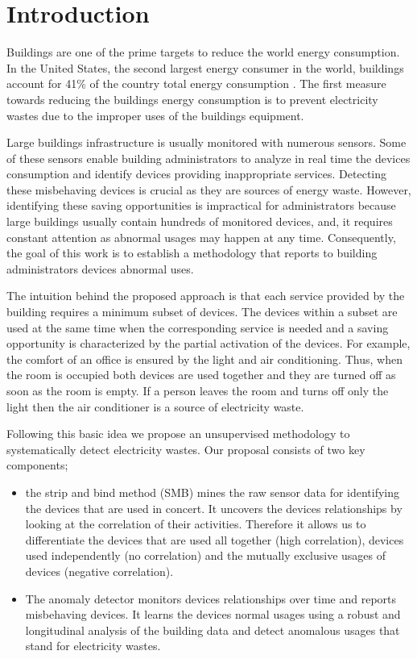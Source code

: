\section{Introduction}
Buildings are one of the prime targets to reduce the world energy consumption.
In the United States, the second largest energy consumer in the world, buildings account for 41\% of the country total energy consumption \cite{aer2011}.
The first measure towards reducing the buildings energy consumption is to prevent electricity wastes due to the improper uses of the buildings equipment.

Large buildings infrastructure is usually monitored with numerous sensors.
Some of these sensors enable building administrators to analyze in real time the devices consumption and identify devices providing inappropriate services.
Detecting these misbehaving devices is crucial as they are sources of energy waste.
However, identifying these saving opportunities is impractical for administrators because large buildings usually contain hundreds of monitored devices, and, it requires constant attention as abnormal usages may happen at any time.
Consequently, the goal of this work is to establish a methodology that reports to building administrators devices abnormal uses.

The intuition behind the proposed approach is that each service provided by the building requires a minimum subset of devices.
The devices within a subset are used at the same time when the corresponding service is needed and a saving opportunity is characterized by the partial activation of the devices.
For example, the comfort of an office is ensured by the light and air conditioning.
Thus, when the room is occupied both devices are used together and they are turned off as soon as the room is empty.
If a person leaves the room and turns off only the light then the air conditioner is a source of electricity waste.

Following this basic idea we propose an unsupervised methodology to systematically detect electricity wastes.
Our proposal consists of two key components;
\begin{itemize}
 \item the strip and bind method (SMB) mines the raw sensor data for identifying the devices that are used in concert.
 It uncovers the devices relationships by looking at the correlation of their activities. 
 Therefore it allows us to differentiate the devices that are used all together (high correlation), devices used independently (no correlation) and the mutually exclusive usages of devices (negative correlation).
 \item The anomaly detector monitors devices relationships over time and reports misbehaving devices.
 It learns the devices normal usages using a robust and longitudinal analysis of the building data and detect anomalous usages that stand for electricity wastes.
\end{itemize}


